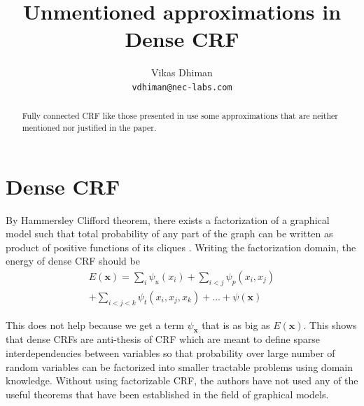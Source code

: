 \documentclass[10pt,twocolumn,letterpaper]{article}
\begin{document}
\title{Unmentioned approximations in Dense CRF}
\author{Vikas Dhiman\\
{\tt\small vdhiman@nec-labs.com}
}
\maketitle
\begin{abstract}
  Fully connected CRF like those presented in \cite{krahenbuhl2012efficient}
  use some approximations that are neither mentioned nor justified in the
  paper.
\end{abstract}

% 
% 
% 
\section{Dense CRF}

By Hammersley Clifford theorem, there exists a factorization of a graphical
model such that total probability of any part of the graph can be written as
product of positive functions of its cliques
\cite[145]{grimmett2010probability}. Writing the factorization domain, the
energy of dense CRF should be 
\begin{multline}
  E(\mathbf{x}) = \sum_i \psi_u(x_i) + \sum_{i < j} \psi_p(x_i, x_j)\\
  + \sum_{i < j < k} \psi_t(x_i, x_j, x_k)
  + \dots
  + \psi(\mathbf{x})
\end{multline}

This does not help because we get a term $\psi_{\mathbf{x}}$ that is as big as
$E(\mathbf{x})$. This shows that dense CRFs are anti-thesis of CRF which are
meant to define sparse interdependencies between variables so that probability
over large number of random variables can be factorized into smaller
tractable problems using domain knowledge. Without using factorizable CRF, the
authors have not used any of the useful theorems that have been established in
the field of graphical models.
\end{document}
